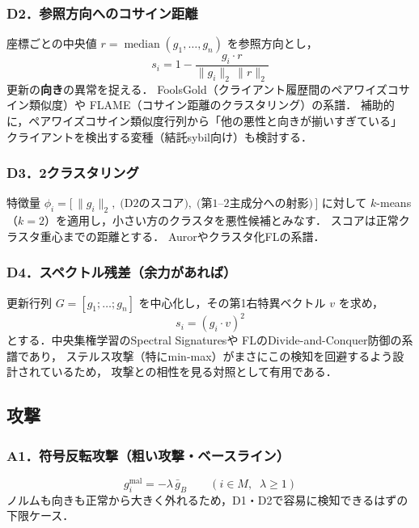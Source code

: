 \documentclass[a4j, dvipdfmx]{jsarticle}  %
\begin{document}
\subsubsection*{D2．参照方向へのコサイン距離}
座標ごとの中央値 $r = \operatorname{median}(g_1,\dots,g_n)$ を参照方向とし，
\begin{equation}
s_i = 1 - \frac{g_i \cdot r}{\|g_i\|_2\,\|r\|_2}
\end{equation}
更新の\textbf{向き}の異常を捉える．
FoolsGold\cite{fung2020limitations}（クライアント履歴間のペアワイズコサイン類似度）や
FLAME\cite{nguyen2022flame}（コサイン距離のクラスタリング）の系譜．
補助的に，ペアワイズコサイン類似度行列から「他の悪性と向きが揃いすぎている」
クライアントを検出する変種（結託sybil向け）も検討する．

\subsubsection*{D3．2クラスタリング}
特徴量 $\phi_i = \big[\,\|g_i\|_2,\; \text{(D2のスコア)},\; \text{(第1--2主成分への射影)}\,\big]$
に対して $k$-means（$k=2$）を適用し，小さい方のクラスタを悪性候補とみなす．
スコアは正常クラスタ重心までの距離とする．
Auror\cite{shen2016auror}やクラスタ化FL\cite{sattler2020byzantine}の系譜．

\subsubsection*{D4．スペクトル残差（余力があれば）}
更新行列 $G = [g_1;\dots;g_n]$ を中心化し，その第1右特異ベクトル $v$ を求め，
\begin{equation}
s_i = (g_i \cdot v)^2
\end{equation}
とする．中央集権学習のSpectral Signatures\cite{tran2018spectral}や
FLのDivide-and-Conquer防御\cite{shejwalkar2021manipulating}の系譜であり，
ステルス攻撃（特にmin-max）がまさにこの検知を回避するよう設計されているため，
攻撃との相性を見る対照として有用である．

\subsection{攻撃}
\label{sec:attacks}

\subsubsection*{A1．符号反転攻撃（粗い攻撃・ベースライン）}
\begin{equation}
g_i^{\text{mal}} = -\lambda\, \bar{g}_B \qquad (i \in M,\;\; \lambda \ge 1)
\end{equation}
ノルムも向きも正常から大きく外れるため，D1・D2で容易に検知できるはずの下限ケース．
\end{document}
